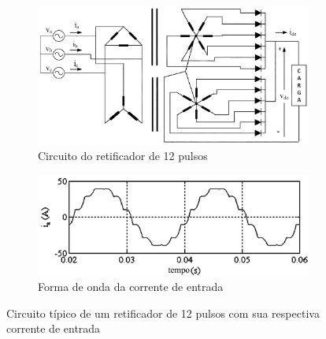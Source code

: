 \begin{figure}[!htbp] %
	\centering
	\begin{subfigure}[b]{0.49\textwidth}
		\centering
		\includegraphics[width=\textwidth]{Cap2/Figuras/12_pulse_rectifier.png}
		\caption{Circuito do retificador de 12 pulsos} 
		\label{fig:12_pulse_rectifier}
	\end{subfigure}%
	\hfill
	\begin{subfigure}[b]{0.49\textwidth}  
		\centering 
		\includegraphics[width=\textwidth]{Cap2/Figuras/12_pulse_wave.png}
		\caption{Forma de onda da corrente de entrada}    
		\label{fig:12_pulse_wave}
	\end{subfigure}%
	\caption{Circuito típico de um retificador de 12 pulsos com sua respectiva corrente de entrada \cite{Singh2008}}
	\label{fig:12_pulse}
\end{figure}

